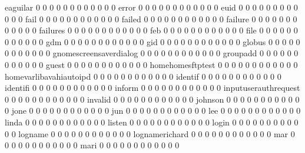 \documentclass[compress,8pt]{beamer}
\begin{document}
\begin{frame}
\begin{Schunk}
  eaguilar                                  0  0  0  0  0  0  0  0  0  0  0  0
  error                                     0  0  0  0  0  0  0  0  0  0  0  0
  euid                                      0  0  0  0  0  0  0  0  0  0  0  0
  fail                                      0  0  0  0  0  0  0  0  0  0  0  0
  failed                                    0  0  0  0  0  0  0  0  0  0  0  0
  failure                                   0  0  0  0  0  0  0  0  0  0  0  0
  failures                                  0  0  0  0  0  0  0  0  0  0  0  0
  feb                                       0  0  0  0  0  0  0  0  0  0  0  0
  file                                      0  0  0  0  0  0  0  0  0  0  0  0
  gdm                                       0  0  0  0  0  0  0  0  0  0  0  0
  gid                                       0  0  0  0  0  0  0  0  0  0  0  0
  globus                                    0  0  0  0  0  0  0  0  0  0  0  0
  gnomescreensaverdialog                    0  0  0  0  0  0  0  0  0  0  0  0
  groupadd                                  0  0  0  0  0  0  0  0  0  0  0  0
  guest                                     0  0  0  0  0  0  0  0  0  0  0  0
  homehomesftptest                          0  0  0  0  0  0  0  0  0  0  0  0
  homevarlibavahiautoipd                    0  0  0  0  0  0  0  0  0  0  0  0
  identif                                   0  0  0  0  0  0  0  0  0  0  0  0
  identifi                                  0  0  0  0  0  0  0  0  0  0  0  0
  inform                                    0  0  0  0  0  0  0  0  0  0  0  0
  inputuserauthrequest                      0  0  0  0  0  0  0  0  0  0  0  0
  invalid                                   0  0  0  0  0  0  0  0  0  0  0  0
  johnson                                   0  0  0  0  0  0  0  0  0  0  0  0
  jone                                      0  0  0  0  0  0  0  0  0  0  0  0
  jun                                       0  0  0  0  0  0  0  0  0  0  0  0
  lee                                       0  0  0  0  0  0  0  0  0  0  0  0
  linda                                     0  0  0  0  0  0  0  0  0  0  0  0
  listen                                    0  0  0  0  0  0  0  0  0  0  0  0
  login                                     0  0  0  0  0  0  0  0  0  0  0  0
  logname                                   0  0  0  0  0  0  0  0  0  0  0  0
  lognamerichard                            0  0  0  0  0  0  0  0  0  0  0  0
  mar                                       0  0  0  0  0  0  0  0  0  0  0  0
  mari                                      0  0  0  0  0  0  0  0  0  0  0  0

\end{Schunk}
\end{frame}
\end{document}
